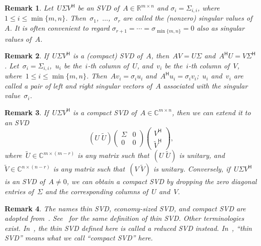 \documentclass[11pt,a4paper]{article}  %
\numberwithin{equation}{section}
\newtheorem{remark}{Remark}%
\theoremstyle{definition}
\def\RR{\mathbb{R}}
\def\CC{\mathbb{C}}
\newcommand{\hmt}{{\scriptscriptstyle{{\mathsf{H}}}}}
\begin{document}
\begin{remark}
  Let~$U\Sigma V^\hmt$ be an SVD of~$A\in \RR^{m\times n}$ and $\sigma_i
  = \Sigma_{i,i}$, where $1\le i\le \min\{m,n\}$. Then~\mbox{$\sigma_1$, $\dots$, $\sigma_r$} are called the
  \textnormal{(}nonzero\textnormal{)} singular values of~$A$. It is often convenient to
  regard $\sigma_{r+1}=\cdots=\sigma_{\min\{m,n\}} = 0$ also as singular values of~$A$.
\end{remark}

\begin{remark}
If~$U\Sigma V^\hmt$ is a \textnormal{(}compact\textnormal{)} SVD
of~$A$, then~$AV = U\Sigma$ and~$A^\hmt U = V\Sigma^\hmt$.
Let~$\sigma_i=\Sigma_{i,i}$,~$u_i$ be the~$i$-th column of~$U$,
and~$v_i$ be the~$i$-th column of~$V$, where~$1\le i \le \min\{m,n\}$.
Then~$A v_i = \sigma_i u_i$ and~$A^\hmt u_i = \sigma_i v_i$;~$u_i$ and~$v_i$
are called a pair of left and right singular vectors of~$A$ associated with the
singular value~$\sigma_{i}$.
\end{remark}

\begin{remark}
  If~$U \Sigma V^\hmt$ is a compact SVD of~$A \in \CC^{m\times n}$,
  then we can extend it to an SVD
  \begin{equation*}
    (U \; \tilde{U})
    \begin{pmatrix}
      \Sigma & 0\\
      0 & 0
    \end{pmatrix}
    \begin{pmatrix}
      V^\hmt\\
      \tilde{V}^\hmt
    \end{pmatrix},
  \end{equation*}
  where~$\tilde{U}\in \CC^{m\times(m-r)}$ is any matrix such that~$(U \; \tilde{U})$ is unitary,
  and~$\tilde{V} \in \CC^{n\times (n-r)}$ is any matrix such that~$(V \; \tilde{V})$ is unitary.
  Conversely, if~$U\Sigma V^\hmt$ is an SVD of~$A\neq 0$, we can obtain a compact
  SVD by dropping the zero diagonal entries of~$\Sigma$ and the
  corresponding columns of~$U$ and~$V$.
\end{remark}

\begin{remark}
    The names \emph{thin} SVD, \emph{economy-sized} SVD, and \emph{compact} SVD are adopted
    from~\cite[Section~6.1]{Bai_etal_2000}. See~\cite[Section~2.4.3]{Golub_VanLoan_2013} for the
    same definition of thin SVD.
    Other terminologies exist.
    In~\cite[Lecture~4]{Trefethen_Bau_1997}, the thin SVD defined here is called a \emph{reduced} SVD instead.
    In~\cite[Theorem~7.3.2.]{Horn_Johnson_2012}, ``thin SVD'' means what we call ``compact SVD''
    here.
\end{remark}
\end{document}
